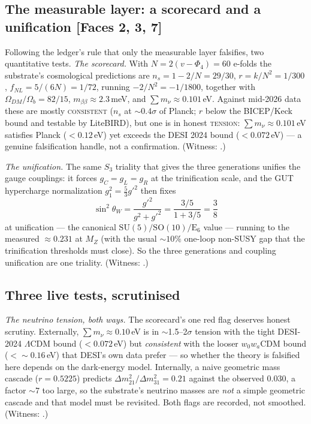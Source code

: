 \documentclass[11pt]{article}
\begin{document}
\subsection{The measurable layer: a scorecard and a unification \texorpdfstring{\normalfont\small[Faces 2, 3, 7]}{[Faces 2, 3, 7]}}
\label{sec:physics}

Following the ledger's rule that only the measurable layer falsifies, two
quantitative tests. \emph{The scorecard.} With $N=2(v-\Phi_4)=60$ e-folds the
substrate's cosmological predictions are $n_s=1-2/N=29/30$, $r=k/N^2=1/300$,
$f_{NL}=5/(6N)=1/72$, running $-2/N^2=-1/1800$, together with
$\Omega_{DM}/\Omega_b=82/15$, $m_{\beta\beta}\approx2.3$\,meV, and
$\textstyle\sum m_\nu\approx0.101$\,eV. Against mid-2026 data these are mostly
\textsc{consistent} ($n_s$ at $\sim0.4\sigma$ of Planck; $r$ below the
BICEP/Keck bound and testable by LiteBIRD), but one is in honest \textsc{tension}:
$\sum m_\nu\approx0.101$\,eV satisfies Planck ($<0.12$\,eV) yet exceeds the DESI
2024 bound ($<0.072$\,eV) --- a genuine falsification handle, not a confirmation.
(Witness: .)

\emph{The unification.} The same $S_3$ triality that gives the three generations
unifies the gauge couplings: it forces $g_C=g_L=g_R$ at the trinification scale,
and the GUT hypercharge normalization $g_1^2=\tfrac53 g'^2$ then fixes
\[
  \sin^2\theta_W=\frac{g'^2}{g^2+g'^2}=\frac{3/5}{1+3/5}=\frac38
\]
at unification --- the canonical $\mathrm{SU}(5)/\mathrm{SO}(10)/\mathrm E_6$ value
--- running to the measured $\approx0.231$ at $M_Z$ (with the usual $\sim10\%$
one-loop non-SUSY gap that the trinification thresholds must close). So the three
generations and coupling unification are one triality. (Witness:
.)

\subsection{Three live tests, scrutinised}

\emph{The neutrino tension, both ways.} The scorecard's one red flag deserves
honest scrutiny. Externally, $\sum m_\nu\approx0.10$\,eV is in $\sim$1.5--2$\sigma$
tension with the tight DESI-2024 $\Lambda$CDM bound ($<0.072$\,eV) but
\emph{consistent} with the looser $w_0w_a$CDM bound ($<\!\sim0.16$\,eV) that DESI's
own data prefer --- so whether the theory is falsified here depends on the
dark-energy model. Internally, a naive geometric mass cascade ($r=0.5225$)
predicts $\Delta m^2_{21}/\Delta m^2_{31}=0.21$ against the observed $0.030$, a
factor $\sim7$ too large, so the substrate's neutrino masses are \emph{not} a
simple geometric cascade and that model must be revisited. Both flags are
recorded, not smoothed. (Witness:
.)
\end{document}
